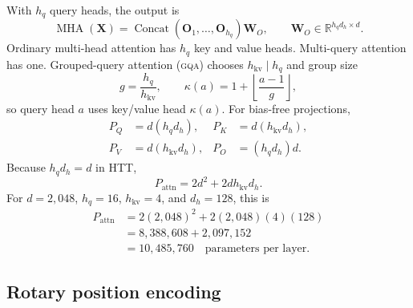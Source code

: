 \documentclass[10pt,letterpaper]{article}
\newcommand{\abbr}[1]{\textsc{\MakeLowercase{#1}}}
\newcommand{\R}{\mathbb{R}}
\newcommand{\1}{\mathbb{1}}
\newcommand{\mat}[1]{\bm{#1}}
\begin{document}
With $h_q$ query heads, the output is
\begin{equation}
  \operatorname{MHA}(\mat X)
  =\operatorname{Concat}(\mat O_1,\ldots,\mat O_{h_q})\mat W_O,
  \qquad \mat W_O\in\R^{h_qd_h\times d}.
  \label{eq:mha}
\end{equation}
Ordinary multi-head attention has $h_q$ key and value heads.  Multi-query attention has one.
Grouped-query attention (\abbr{GQA}) chooses $h_{\mathrm{kv}}\mid h_q$ and group size
\begin{equation}
  g=\frac{h_q}{h_{\mathrm{kv}}},\qquad
  \kappa(a)=1+\left\lfloor\frac{a-1}{g}\right\rfloor,
  \label{eq:gqa-map}
\end{equation}
so query head $a$ uses key/value head $\kappa(a)$.  For bias-free projections,
\begin{align}
  P_Q &= d(h_qd_h), & P_K&=d(h_{\mathrm{kv}}d_h),\\
  P_V &= d(h_{\mathrm{kv}}d_h), & P_O&=(h_qd_h)d.
\end{align}
Because $h_qd_h=d$ in HTT,
\begin{equation}
  P_{\mathrm{attn}}
  =2d^2+2d h_{\mathrm{kv}}d_h.
  \label{eq:attn-params}
\end{equation}
For $d=2{,}048$, $h_q=16$, $h_{\mathrm{kv}}=4$, and $d_h=128$, this is
\begin{align}
  P_{\mathrm{attn}}
  &=2(2{,}048)^2+2(2{,}048)(4)(128)\\
  &=8{,}388{,}608+2{,}097{,}152\\
  &=10{,}485{,}760
  \quad\text{parameters per layer}.
  \label{eq:attn-params-numeric}
\end{align}

\subsection{Rotary position encoding}
\end{document}
